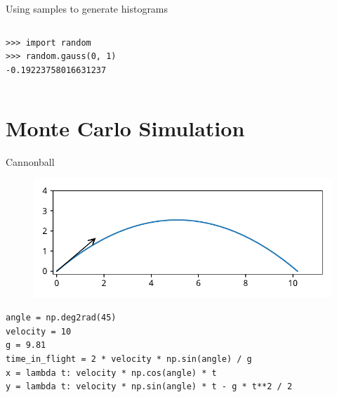 \documentclass[12pt, aspectratio=149]{beamer}
\theoremstyle{plain}
\begin{document}
\begin{frame}[fragile]{Using samples to generate histograms}
\begin{columns}
\begin{column}{0.5\textwidth}
\begin{center}
\begin{figure}
     \end{figure}
      \begin{verbatim}
>>> import random
>>> random.gauss(0, 1)
-0.19223758016631237
      \end{verbatim}
     \end{center}
\end{column}
\end{columns}
\end{frame}

\section{Monte Carlo Simulation}

\begin{frame}[fragile]{Cannonball}
\vspace*{-1em}
\begin{center}
 \begin{figure}
    	\centering
    	\includegraphics[width=0.99\linewidth]{figures/cannonball}
 \end{figure}
 \end{center}
 \vspace*{-2em}

\begin{center}
\begin{verbatim} 
angle = np.deg2rad(45)
velocity = 10
g = 9.81
time_in_flight = 2 * velocity * np.sin(angle) / g
x = lambda t: velocity * np.cos(angle) * t
y = lambda t: velocity * np.sin(angle) * t - g * t**2 / 2
\end{verbatim}
\end{center}
\end{frame}
\end{document}
